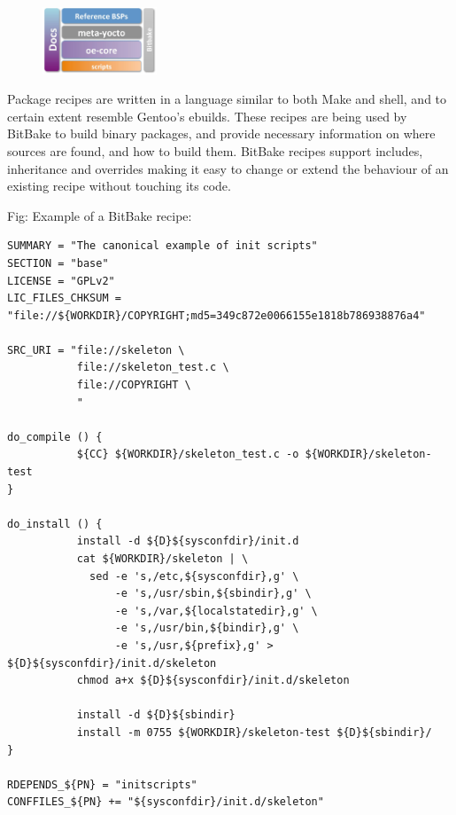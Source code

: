 \documentclass[10pt, a5paper]{article}
\begin{document}
\begin{figure}[h!]
  \centering
  \includegraphics[height=2cm]{w_07_2016_Shadura2.png}
\end{figure}

Package recipes are written in a language similar to both Make and shell, and to certain extent resemble Gentoo's ebuilds. These recipes are being used by BitBake to build binary packages, and provide necessary information on where sources are found, and how to build them. BitBake recipes support includes, inheritance and overrides making it easy to change or extend the behaviour of an existing recipe without touching its code.

Fig: Example of a BitBake recipe:
\lstset{ %
language=C,                 %
basicstyle=\small\sffamily, %
breaklines=true,           %
breakatwhitespace=false, %
}

\begin{lstlisting}
SUMMARY = "The canonical example of init scripts"
SECTION = "base"
LICENSE = "GPLv2"
LIC_FILES_CHKSUM = "file://${WORKDIR}/COPYRIGHT;md5=349c872e0066155e1818b786938876a4"

SRC_URI = "file://skeleton \
           file://skeleton_test.c \
           file://COPYRIGHT \
           "

do_compile () {
           ${CC} ${WORKDIR}/skeleton_test.c -o ${WORKDIR}/skeleton-test
}

do_install () {
           install -d ${D}${sysconfdir}/init.d
           cat ${WORKDIR}/skeleton | \
             sed -e 's,/etc,${sysconfdir},g' \
                 -e 's,/usr/sbin,${sbindir},g' \ 
                 -e 's,/var,${localstatedir},g' \ 
                 -e 's,/usr/bin,${bindir},g' \ 
                 -e 's,/usr,${prefix},g' > ${D}${sysconfdir}/init.d/skeleton 
           chmod a+x ${D}${sysconfdir}/init.d/skeleton 

           install -d ${D}${sbindir} 
           install -m 0755 ${WORKDIR}/skeleton-test ${D}${sbindir}/
}

RDEPENDS_${PN} = "initscripts"
CONFFILES_${PN} += "${sysconfdir}/init.d/skeleton"
\end{lstlisting}
\end{document}
